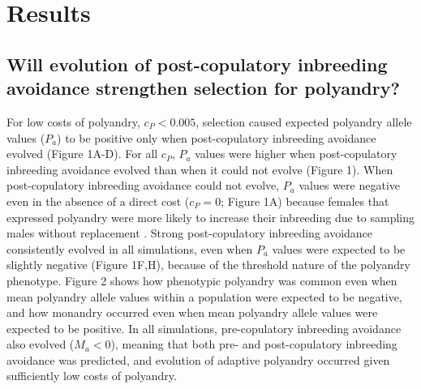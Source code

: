 \documentclass[10pt,letterpaper]{article}
\begin{document}
\section*{Results}

\subsection*{Will evolution of post-copulatory inbreeding avoidance strengthen selection for polyandry?}


For low costs of polyandry, $c_{P} < 0.005$, selection caused expected polyandry allele values ($P_{a}$) to be positive only when post-copulatory inbreeding avoidance evolved (Figure 1A-D). For all $c_{P}$, $P_{a}$ values were higher when post-copulatory inbreeding avoidance evolved than when it could not evolve (Figure 1). When post-copulatory inbreeding avoidance could not evolve, $P_{a}$ values were negative even in the absence of a direct cost ($c_{P}=0$; Figure 1A) because females that expressed polyandry were more likely to increase their inbreeding due to sampling males without replacement \cite[][]{Duthie}. Strong post-copulatory inbreeding avoidance consistently evolved in all simulations, even when $P_{a}$ values were expected to be slightly negative (Figure 1F,H), because of the threshold nature of the polyandry phenotype. Figure 2 shows how phenotypic polyandry was common even when mean polyandry allele values within a population were expected to be negative, and how monandry occurred even when mean polyandry allele values were expected to be positive. In all simulations, pre-copulatory inbreeding avoidance also evolved ($M_{a}<0$), meaning that both pre- and post-copulatory inbreeding avoidance was predicted, and evolution of adaptive polyandry occurred given sufficiently low costs of polyandry.
\end{document}
